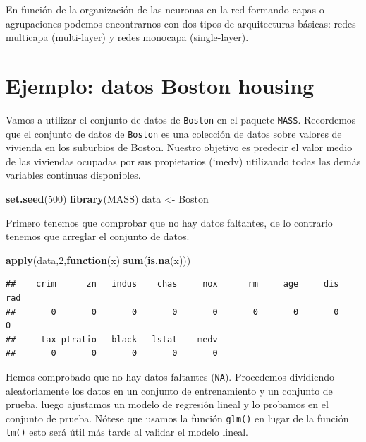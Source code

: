 \documentclass[]{book}
\newenvironment{Shaded}{\begin{snugshade}}{\end{snugshade}}
\newcommand{\KeywordTok}[1]{\textcolor[rgb]{0.13,0.29,0.53}{\textbf{#1}}}
\newcommand{\DecValTok}[1]{\textcolor[rgb]{0.00,0.00,0.81}{#1}}
\newcommand{\StringTok}[1]{\textcolor[rgb]{0.31,0.60,0.02}{#1}}
\newcommand{\ControlFlowTok}[1]{\textcolor[rgb]{0.13,0.29,0.53}{\textbf{#1}}}
\newcommand{\NormalTok}[1]{#1}
\begin{document}
En función de la organización de las neuronas en la red formando capas o
agrupaciones podemos encontrarnos con dos tipos de arquitecturas
básicas: redes multicapa (multi-layer) y redes monocapa (single-layer).

\section{Ejemplo: datos Boston
housing}\label{ejemplo-datos-boston-housing}

Vamos a utilizar el conjunto de datos de \texttt{Boston} en el paquete
\texttt{MASS}. Recordemos que el conjunto de datos de \texttt{Boston} es
una colección de datos sobre valores de vivienda en los suburbios de
Boston. Nuestro objetivo es predecir el valor medio de las viviendas
ocupadas por sus propietarios (`medv) utilizando todas las demás
variables continuas disponibles.

\begin{Shaded}
\begin{Highlighting}[]
\KeywordTok{set.seed}\NormalTok{(}\DecValTok{500}\NormalTok{)}
\KeywordTok{library}\NormalTok{(MASS)}
\NormalTok{data <-}\StringTok{ }\NormalTok{Boston}
\end{Highlighting}
\end{Shaded}

Primero tenemos que comprobar que no hay datos faltantes, de lo
contrario tenemos que arreglar el conjunto de datos.

\begin{Shaded}
\begin{Highlighting}[]
\KeywordTok{apply}\NormalTok{(data,}\DecValTok{2}\NormalTok{,}\ControlFlowTok{function}\NormalTok{(x) }\KeywordTok{sum}\NormalTok{(}\KeywordTok{is.na}\NormalTok{(x)))}
\end{Highlighting}
\end{Shaded}

\begin{verbatim}
##    crim      zn   indus    chas     nox      rm     age     dis     rad 
##       0       0       0       0       0       0       0       0       0 
##     tax ptratio   black   lstat    medv 
##       0       0       0       0       0
\end{verbatim}

Hemos comprobado que no hay datos faltantes (\texttt{NA}). Procedemos
dividiendo aleatoriamente los datos en un conjunto de entrenamiento y un
conjunto de prueba, luego ajustamos un modelo de regresión lineal y lo
probamos en el conjunto de prueba. Nótese que usamos la función
\texttt{glm()} en lugar de la función \texttt{lm()} esto será útil más
tarde al validar el modelo lineal.
\end{document}
